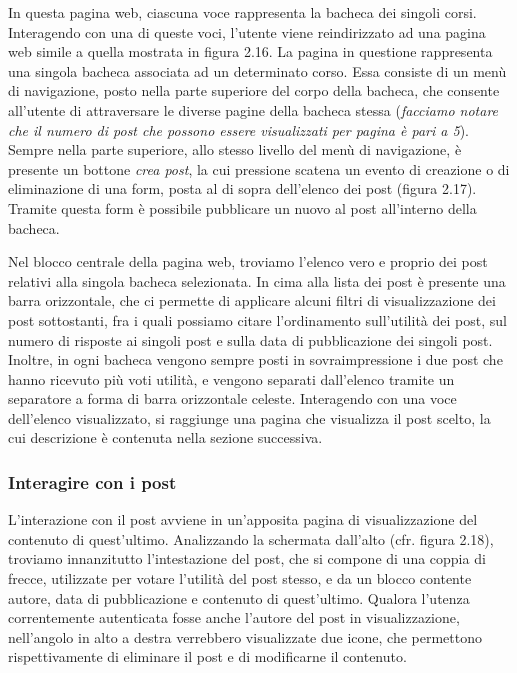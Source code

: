 \documentclass [a4paper,11pt]{book}
\begin{document}
In questa pagina web, ciascuna voce rappresenta la bacheca dei singoli corsi. Interagendo con una di queste voci, l'utente viene reindirizzato ad una pagina web simile a quella mostrata in figura 2.16. La pagina in questione rappresenta una singola bacheca associata ad un determinato corso. Essa consiste di un menù di navigazione, posto nella parte superiore del corpo della bacheca, che consente all'utente di attraversare le diverse pagine della bacheca stessa (\emph{facciamo notare che il numero di post che possono essere visualizzati per pagina è pari a 5}). Sempre nella parte superiore, allo stesso livello del menù di navigazione, è presente un bottone \emph{crea post}, la cui pressione scatena un evento di creazione o di eliminazione di una form, posta al di sopra dell'elenco dei post (figura 2.17). Tramite questa form è possibile pubblicare un nuovo al post all'interno della bacheca.

Nel blocco centrale della pagina web, troviamo l'elenco vero e proprio dei post relativi alla singola bacheca selezionata. In cima alla lista dei post è presente una barra orizzontale, che ci permette di applicare alcuni filtri di visualizzazione dei post sottostanti, fra i quali possiamo citare l'ordinamento sull'utilità dei post, sul numero di risposte ai singoli post e sulla data di pubblicazione dei singoli post. Inoltre, in ogni bacheca vengono sempre posti in sovraimpressione i due post che hanno ricevuto più voti utilità, e vengono separati dall'elenco tramite un separatore a forma di barra orizzontale celeste. Interagendo con una voce dell'elenco visualizzato, si raggiunge una pagina che visualizza il post scelto, la cui descrizione è contenuta nella sezione successiva.

\medskip

\subsubsection{Interagire con i post}

L'interazione con il post avviene in un'apposita pagina di visualizzazione del contenuto di quest'ultimo. Analizzando la schermata dall'alto (cfr. figura 2.18), troviamo innanzitutto l'intestazione del post, che si compone di una coppia di frecce, utilizzate per votare l'utilità del post stesso, e da un blocco contente autore, data di pubblicazione e contenuto di quest'ultimo. Qualora l'utenza correntemente autenticata fosse anche l'autore del post in visualizzazione, nell'angolo in alto a destra verrebbero visualizzate due icone, che permettono rispettivamente di eliminare il post e di modificarne il contenuto.
\end{document}
